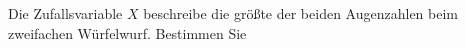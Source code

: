 \documentclass{abgabe}
\begin{document}
\begin{questions}
    \question
    Die Zufallsvariable $X$ beschreibe die größte der beiden Augenzahlen beim zweifachen Würfelwurf. 
    Bestimmen Sie
\end{questions}
\end{document}
